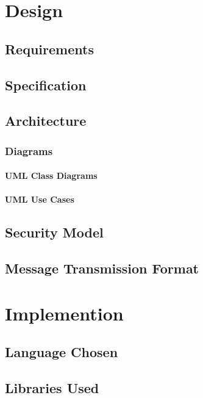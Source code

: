 \documentclass[a4paper,12pt]{book}
\begin{document}
\chapter{Design}

\section{Requirements}

\section{Specification}

\section{Architecture}

\subsection{Diagrams}

\subsubsection{UML Class Diagrams}

\subsubsection{UML Use Cases}

\section{Security Model}

\section{Message Transmission Format}


\chapter{Implemention}

\section{Language Chosen}

\section{Libraries Used}
\end{document}
